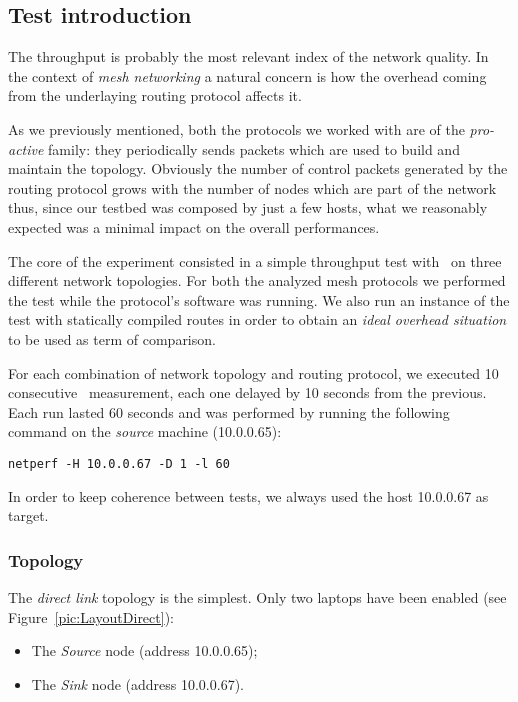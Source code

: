 \subsection{Test introduction}

    The throughput is probably the most relevant index of the network
    quality. In the context of \emph{mesh networking} a natural concern is
    how the overhead coming from the underlaying routing protocol affects
    it.

    As we previously mentioned, both the protocols we worked
    with are of the \emph{pro-active} family: they periodically sends
    packets which are used to build and maintain the topology. Obviously
    the number of control packets generated by the routing protocol grows
    with the number of nodes which are part of the network thus, since our
    testbed was composed by just a few hosts, what we reasonably expected
    was a minimal impact on the overall performances.

    The core of the experiment consisted in a simple throughput test with
    \netperf\ on three different network topologies. For both the
    analyzed mesh protocols we performed the test while the protocol's
    software was running. We also run an instance of the test with
    statically compiled routes in order to obtain an \emph{ideal overhead
    situation} to be used as term of comparison.

    For each combination of network topology and routing protocol, we
    executed 10 consecutive \netperf\ measurement, each one delayed by 10 seconds
    from the previous. Each run lasted 60 seconds and was performed by
    running the following command on the \emph{source} machine (10.0.0.65):
\begin{verbatim}
netperf -H 10.0.0.67 -D 1 -l 60
\end{verbatim}

    In order to keep coherence between tests, we always used the host
    10.0.0.67 as target.

    \subsubsection{Topology}

        The \emph{direct link} topology is the simplest. Only two laptops
        have been enabled (see Figure~\ref{pic:LayoutDirect}):
        \begin{itemize}
        \item   The \emph{Source} node (address 10.0.0.65);
        \item   The \emph{Sink} node (address 10.0.0.67).
        \end{itemize}

